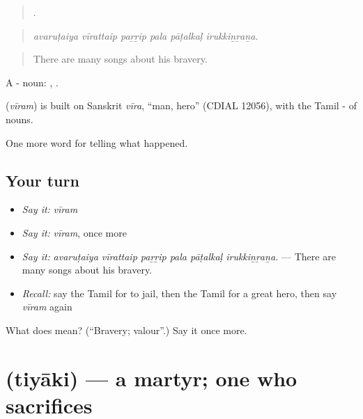 \begin{quote}
     .
\end{quote}

\begin{quote}
\emph{avaruṭaiya vīrattaip paṟṟip pala pāṭalkaḷ irukkiṉṟaṉa.}
\end{quote}

\begin{quote}
There are many songs about his bravery.
\end{quote}

A - noun: , .

\begin{cousinweb}
\textbf{} (\emph{vīram}) is built on Sanskrit \emph{vīra}, \textquotedblleft{}man, hero\textquotedblright{} (CDIAL 12056), with the Tamil - of nouns.
\end{cousinweb}

\begin{grammarlens}[title={What you've built}]
One more word for telling what happened.
\end{grammarlens}

\subsection*{Your turn}
\begin{itemize}
\raggedright
  \item \emph{Say it:} \emph{vīram}
  \item \emph{Say it:} \emph{vīram}, once more
  \item \emph{Say it:} \emph{avaruṭaiya vīrattaip paṟṟip pala pāṭalkaḷ irukkiṉṟaṉa.} — There are many songs about his bravery.
  \item \emph{Recall:} say the Tamil for to jail, then the Tamil for a great hero, then say \emph{vīram} again
\end{itemize}

\begin{tcolorbox}[breakable,colback=teal!4,colframe=teal!35!black,title={Before you move on}]
What does  mean? (\textquotedblleft{}Bravery; valour\textquotedblright{}.) Say it once more.
\end{tcolorbox}
\section[\texorpdfstring{\ta{தியாகி} (tiyāki)}{தியாகி (tiyāki)}]{ (tiyāki) — a martyr; one who sacrifices}

